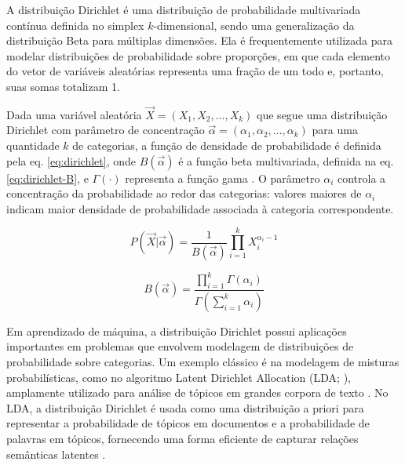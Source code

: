 A distribuição Dirichlet \citep{distbook-dirichlet} é uma distribuição de probabilidade multivariada contínua definida no simplex \( k \)-dimensional, sendo uma generalização da distribuição Beta \citep{distbook-beta} para múltiplas dimensões. Ela é frequentemente utilizada para modelar distribuições de probabilidade sobre proporções, em que cada elemento do vetor de variáveis aleatórias representa uma fração de um todo e, portanto, suas somas totalizam 1.

Dada uma variável aleatória \( \vec{X} = (X_1, X_2, \dots, X_k) \) que segue uma distribuição Dirichlet com parâmetro de concentração \( \vec{\alpha} = (\alpha_1, \alpha_2, \dots, \alpha_k) \) para uma quantidade $k$ de categorias, a função de densidade de probabilidade é definida pela eq. \eqref{eq:dirichlet}, onde \( B(\vec{\alpha}) \) é a função beta multivariada, definida na eq. \eqref{eq:dirichlet-B}, e \( \Gamma(\cdot) \) representa a função gama \citep{distbook-gamma}. O parâmetro \( \alpha_i \) controla a concentração da probabilidade ao redor das categorias: valores maiores de \( \alpha_i \) indicam maior densidade de probabilidade associada à categoria correspondente.

\begin{equation}\label{eq:dirichlet}
  P(\vec{X} | \vec{\alpha}) = \frac{1}{B (\vec{\alpha})} \prod_{i=1}^k X_i^{\alpha_i - 1}
\end{equation}

\begin{equation}\label{eq:dirichlet-B}
  B(\vec{\alpha}) = \frac{\prod_{i=1}^k \Gamma(\alpha_i)}{\Gamma\left(\sum_{i=1}^k \alpha_i\right)}
\end{equation}


Em aprendizado de máquina, a distribuição Dirichlet possui aplicações importantes em problemas que envolvem modelagem de distribuições de probabilidade sobre categorias. Um exemplo clássico é na modelagem de misturas probabilísticas, como no algoritmo Latent Dirichlet Allocation (LDA; \citealp{lda}), amplamente utilizado para análise de tópicos em grandes corpora de texto \citep{jelodar2019}. No LDA, a distribuição Dirichlet é usada como uma distribuição a priori para representar a probabilidade de tópicos em documentos e a probabilidade de palavras em tópicos, fornecendo uma forma eficiente de capturar relações semânticas latentes \citep{canini2009}.



